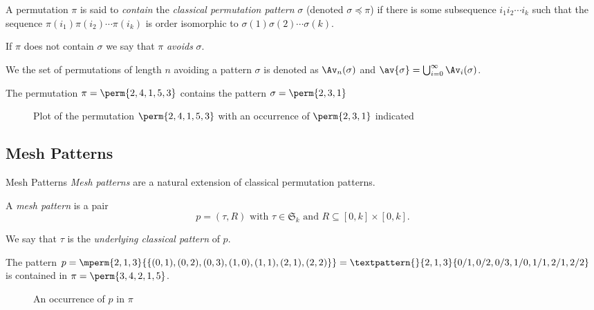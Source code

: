 \begin{frame}
  \begin{definition}
    A permutation \(\pi\) is said to \emph{contain} the \emph{classical
    permutation pattern} \(\sigma\)
    (denoted \(\sigma \preceq \pi\)) if there is some
    subsequence \(i_1i_2\dotsm{}i_k\) such that the sequence
    \(\pi(i_1)\pi(i_2)\dotsm\pi(i_k)\) is order isomorphic to
    \(\sigma(1)\sigma(2)\dotsm\sigma(k)\).
  \end{definition}

  If \(\pi\) does not contain \(\sigma\) we say that \(\pi\) \emph{avoids}
  \(\sigma\).

  We the set of permutations of length \(n\) avoiding a pattern \(\sigma\) is
  denoted as \(\Av_n(\sigma)\) and
  \(\av{\sigma} = \bigcup_{i=0}^{\infty}\Av_i(\sigma)\).
\end{frame}

\begin{frame}
  \begin{example}
    The permutation \(\pi = \perm{2,4,1,5,3}\) contains the pattern
    \(\sigma = \perm{2,3,1}\)
    \begin{figure}[htb]
      \centering
      \caption{Plot of the permutation \(\perm{2,4,1,5,3}\) with an occurrence
      of \(\perm{2,3,1}\) indicated}
    \end{figure}
  \end{example}
\end{frame}

\subsection{Mesh Patterns}
\label{sub:Mesh Patterns}
\begin{frame}{Mesh Patterns}
  \emph{Mesh patterns} are a natural extension of classical permutation patterns.
  \begin{definition}
    A \emph{mesh pattern} is a pair
    \begin{equation*}
      p = (\tau,R)\text{ with } \tau \in \mathfrak{S}_k \text{ and } R \subseteq
      [0,k]\times [0,k].
    \end{equation*}
  \end{definition}
  We say that \(\tau\) is the \emph{underlying classical pattern} of \(p\).
\end{frame}

\begin{frame}
  \begin{example}
      The pattern \(p=\mperm{2,1,3}{\{(0,1),(0,2),(0,3),(1,0),(1,1),(2,1),(2,2)\}}=
      \textpattern{}{ 2, 1, 3 }{ 0/1, 0/2,0/3, 1/0, 1/1, 2/1, 2/2 }\) is contained in
      \(\pi = \perm{3,4,2,1,5}\).
      \begin{figure}[htb]
        \centering
      \caption{ An occurrence of \(p\) in \(\pi\) }
      \end{figure}
  \end{example}
\end{frame}

